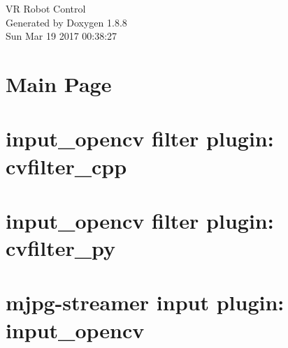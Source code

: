 \documentclass[twoside]{book}
\newcommand{\+}{\discretionary{\mbox{\scriptsize$\hookleftarrow$}}{}{}}
\newcommand{\clearemptydoublepage}{%
  \newpage{\pagestyle{empty}\cleardoublepage}%
}
\begin{document}
\hypersetup{pageanchor=false,
             bookmarks=true,
             bookmarksnumbered=true,
             pdfencoding=unicode
            }
\begin{titlepage}
\vspace*{7cm}
\begin{center}%
{\Large V\+R Robot Control }\\
\vspace*{1cm}
{\large Generated by Doxygen 1.8.8}\\
\vspace*{0.5cm}
{\small Sun Mar 19 2017 00:38:27}\\
\end{center}
\end{titlepage}
\clearemptydoublepage
\tableofcontents
\clearemptydoublepage
{}
\hypersetup{pageanchor=true}

\chapter{Main Page}
\label{index}\hypertarget{index}{}
\chapter{input\+\_\+opencv filter plugin\+: cvfilter\+\_\+cpp}
\label{md_raspi-server_mjpg-streamer_plugins_input_opencv_filters_cvfilter_cpp_README}
\hypertarget{md_raspi-server_mjpg-streamer_plugins_input_opencv_filters_cvfilter_cpp_README}{}

\chapter{input\+\_\+opencv filter plugin\+: cvfilter\+\_\+py}
\label{md_raspi-server_mjpg-streamer_plugins_input_opencv_filters_cvfilter_py_README}
\hypertarget{md_raspi-server_mjpg-streamer_plugins_input_opencv_filters_cvfilter_py_README}{}

\chapter{mjpg-\/streamer input plugin\+: input\+\_\+opencv}
\label{md_raspi-server_mjpg-streamer_plugins_input_opencv_README}
\hypertarget{md_raspi-server_mjpg-streamer_plugins_input_opencv_README}{}

\end{document}
